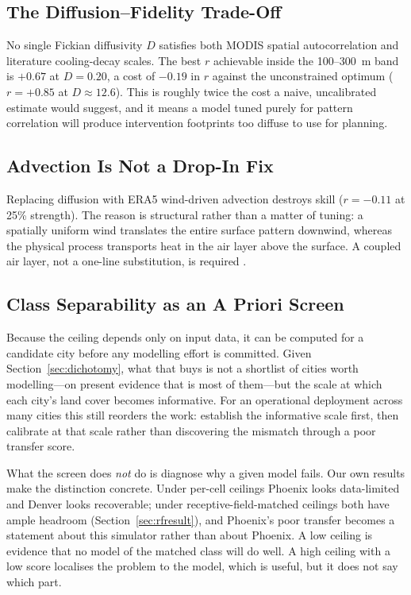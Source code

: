 \documentclass[remotesensing,article,submit,oneauthor]{Definitions/mdpi}
\begin{document}
\subsection{The Diffusion--Fidelity Trade-Off}

No single Fickian diffusivity $D$ satisfies both MODIS spatial
autocorrelation and literature cooling-decay scales. The best $r$
achievable inside the 100--300~m band is $+0.67$ at $D = 0.20$, a cost of
$-0.19$ in $r$ against the unconstrained optimum ($r = +0.85$ at
$D \approx 12.6$). This is roughly twice the cost a naive, uncalibrated
estimate would suggest, and it means a model tuned purely for pattern
correlation will produce intervention footprints too diffuse to use for
planning.

\subsection{Advection Is Not a Drop-In Fix}

Replacing diffusion with ERA5 wind-driven advection destroys skill
($r = -0.11$ at 25\% strength). The reason is structural rather than a
matter of tuning: a spatially uniform wind translates the entire surface
pattern downwind, whereas the physical process transports heat in the air
layer above the surface. A coupled air layer, not a one-line
substitution, is required \cite{mitraka2025prototypes}.

\subsection{Class Separability as an A Priori Screen}

Because the ceiling depends only on input data, it can be computed for a
candidate city before any modelling effort is committed. Given
Section~\ref{sec:dichotomy}, what that buys is not a shortlist of cities
worth modelling---on present evidence that is most of them---but the scale
at which each city's land cover becomes informative. For an operational
deployment across many cities this still reorders the work: establish the
informative scale first, then calibrate at that scale rather than
discovering the mismatch through a poor transfer score.

What the screen does \emph{not} do is diagnose why a given model fails.
Our own results make the distinction concrete. Under per-cell ceilings
Phoenix looks data-limited and Denver looks recoverable; under
receptive-field-matched ceilings both have ample headroom
(Section~\ref{sec:rfresult}), and Phoenix's poor transfer becomes a
statement about this simulator rather than about Phoenix. A low ceiling
is evidence that no model of the matched class will do well. A high
ceiling with a low score localises the problem to the model, which is
useful, but it does not say which part.
\end{document}
